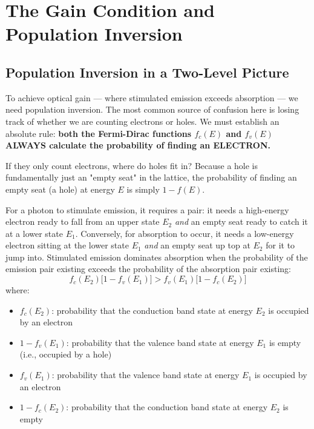 \section{The Gain Condition and Population Inversion}

\subsection{Population Inversion in a Two-Level Picture}

To achieve optical gain — where stimulated emission exceeds absorption — we need population inversion. The most common source of confusion here is losing track of whether we are counting electrons or holes. We must establish an absolute rule: \textbf{both the Fermi-Dirac functions $f_c(E)$ and $f_v(E)$ ALWAYS calculate the probability of finding an ELECTRON.}

If they only count electrons, where do holes fit in? Because a hole is fundamentally just an "empty seat" in the lattice, the probability of finding an empty seat (a hole) at energy $E$ is simply $1 - f(E)$.

For a photon to stimulate emission, it requires a pair: it needs a high-energy electron ready to fall from an upper state $E_2$ \emph{and} an empty seat ready to catch it at a lower state $E_1$. Conversely, for absorption to occur, it needs a low-energy electron sitting at the lower state $E_1$ \emph{and} an empty seat up top at $E_2$ for it to jump into. Stimulated emission dominates absorption when the probability of the emission pair existing exceeds the probability of the absorption pair existing:
\begin{equation*}
    f_c(E_2)\bigl[1 - f_v(E_1)\bigr] > f_v(E_1)\bigl[1 - f_c(E_2)\bigr]
\end{equation*}
where:
\begin{itemize}
    \item $f_c(E_2)$: probability that the conduction band state at energy $E_2$ is occupied by an electron
    \item $1 - f_v(E_1)$: probability that the valence band state at energy $E_1$ is empty (i.e., occupied by a hole)
    \item $f_v(E_1)$: probability that the valence band state at energy $E_1$ is occupied by an electron
    \item $1 - f_c(E_2)$: probability that the conduction band state at energy $E_2$ is empty
\end{itemize}

